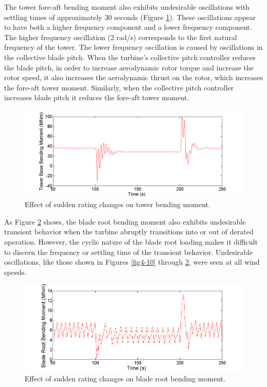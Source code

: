 The tower fore-aft bending moment also exhibits undesirable oscillations with settling times of approximately 30 seconds (Figure \ref{fig4-11}). These oscillations appear to have both a higher frequency component and a lower frequency component. The higher frequency oscillation (2 rad/s) corresponds to the first natural frequency of the tower. The lower frequency oscillation is caused by oscillations in the collective blade pitch. When the turbine's collective pitch controller reduces the blade pitch, in order to increase aerodynamic rotor torque and increase the rotor speed, it also increases the aerodynamic thrust on the rotor, which increases the fore-aft tower moment. Similarly, when the collective pitch controller increases blade pitch it reduces the fore-aft tower moment. 

\begin{figure}[htb]
	\centering
		\includegraphics[width = \linewidth]{Figures/ch4Figures/fig4-11.png}
		
	\caption{Effect of sudden rating changes on tower bending moment.}
	\label{fig4-11}
\end{figure}

As Figure \ref{fig4-12} shows, the blade root bending moment also exhibits undesirable transient behavior when the turbine abruptly transitions into or out of derated operation. However, the cyclic nature of the blade root loading makes it difficult to discern the frequency or settling time of the transient behavior. Undesirable oscillations, like those shown in Figures \ref{fig4-10} through \ref{fig4-12}, were seen at all wind speeds.

\begin{figure}[htb]
	\centering
		\includegraphics[width = \linewidth]{Figures/ch4Figures/fig4-12.png}
		
	\caption{Effect of sudden rating changes on blade root bending moment.}
	\label{fig4-12}
\end{figure}

